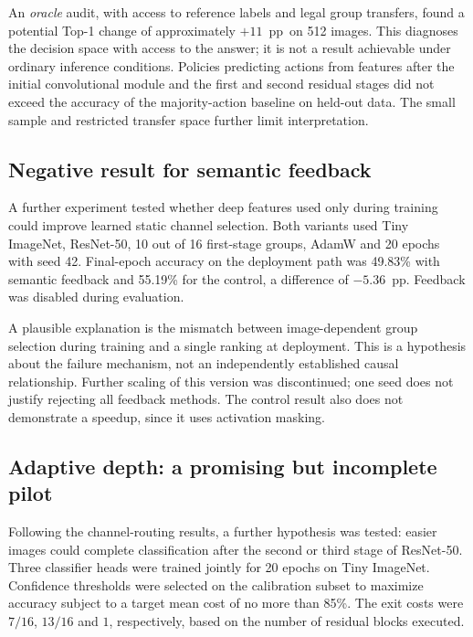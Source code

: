 \documentclass[12pt,a4paper]{article}
\newcommand{\pp}{pp}
\begin{document}
An \emph{oracle} audit, with access to reference labels and legal group
transfers, found a potential Top-1 change of approximately $+11$~\pp\
on 512 images. This diagnoses the decision space with access to the answer;
it is not a result achievable under ordinary inference conditions.
Policies predicting actions from features after the initial convolutional
module and the first and second residual stages did not exceed the accuracy
of the majority-action baseline on held-out data.
The small sample and restricted transfer space further limit interpretation.

\subsection{Negative result for semantic feedback}

A further experiment tested whether deep features used only during training
could improve learned static channel selection.
Both variants used Tiny ImageNet, ResNet-50, 10 out of 16 first-stage groups,
AdamW and 20 epochs with seed 42.
Final-epoch accuracy on the deployment path was 49.83\% with semantic
feedback and 55.19\% for the control, a difference of $-5.36$~\pp.
Feedback was disabled during evaluation.

A plausible explanation is the mismatch between image-dependent group
selection during training and a single ranking at deployment.
This is a hypothesis about the failure mechanism, not an independently
established causal relationship. Further scaling of this version was
discontinued; one seed does not justify rejecting all feedback methods.
The control result also does not demonstrate a speedup, since it uses
activation masking.

\subsection{Adaptive depth: a promising but incomplete pilot}

Following the channel-routing results, a further hypothesis was tested:
easier images could complete classification after the second or third
stage of ResNet-50. Three classifier heads were trained jointly for
20 epochs on Tiny ImageNet.
Confidence thresholds were selected on the calibration subset to maximize
accuracy subject to a target mean cost of no more than 85\%.
The exit costs were $7/16$, $13/16$ and $1$, respectively,
based on the number of residual blocks executed.
\end{document}
